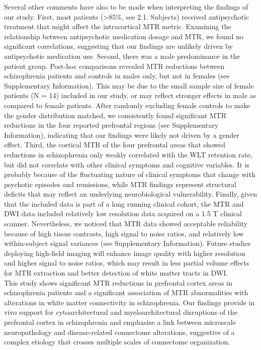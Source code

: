 \begin{refsection}
Several other comments have also to be made when interpreting the findings of our study. First, most patients (>85\%, see 2.1. Subjects) received antipsychotic treatment that might affect the intracortical MTR metric. Examining the relationship between antipsychotic medication dosage and MTR, we found no significant correlations, suggesting that our findings are unlikely driven by antipsychotic medication use. Second, there was a male predominance in the patient group. Post-hoc comparisons revealed MTR reductions between schizophrenia patients and controls in males only, but not in females (see Supplementary Information). This may be due to the small sample size of female patients (N = 14) included in our study, or may reflect stronger effects in male as compared to female patients. After randomly excluding female controls to make the gender distribution matched, we consistently found significant MTR reductions in the four reported prefrontal regions (see Supplementary Information), indicating that our findings were likely not driven by a gender effect. Third, the cortical MTR of the four prefrontal areas that showed reductions in schizophrenia only weakly correlated with the WLT retention rate, but did not correlate with other clinical symptoms and cognitive variables. It is probably because of the fluctuating nature of clinical symptoms that change with psychotic episodes and remissions, while MTR findings represent structural deficits that may reflect an underlying neurobiological vulnerability. Finally, given that the included data is part of a long running clinical cohort, the MTR and DWI data included relatively low resolution data acquired on a 1.5 T clinical scanner. Nevertheless, we noticed that MTR data showed acceptable reliability because of high tissue contrasts, high signal to noise ratios, and relatively low within-subject signal variances (see Supplementary Information). Future studies deploying high-field imaging will enhance image quality with higher resolution and higher signal to noise ratios, which may result in less partial volume effects for MTR extraction and better detection of white matter tracts in DWI. \\

This study shows significant MTR reductions in prefrontal cortex areas in schizophrenia patients and a significant association of MTR abnormalities with alterations in white matter connectivity in schizophrenia. Our findings provide in vivo support for cytoarchitectural and myeloarchitectural disruptions of the prefrontal cortex in schizophrenia and emphasize a link between microscale neuropathology and disease-related connectome alterations, suggestive of a complex etiology that crosses multiple scales of connectome organization.

\printbibliography[heading=subbibliography]

\end{refsection}

